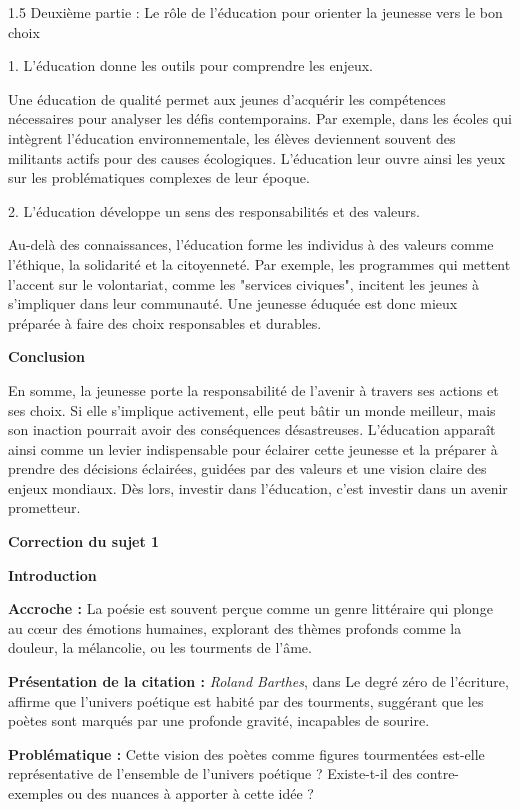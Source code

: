 \documentclass[12pt]{article}
\begin{document}
\begin{spacing}{1.5}
Deuxième partie : Le rôle de l'éducation pour orienter la jeunesse vers le bon choix

1. L'éducation donne les outils pour comprendre les enjeux.
  
Une éducation de qualité permet aux jeunes d'acquérir les compétences nécessaires pour analyser les défis contemporains. Par exemple, dans les écoles qui intègrent l'éducation environnementale, les élèves deviennent souvent des militants actifs pour des causes écologiques. L'éducation leur ouvre ainsi les yeux sur les problématiques complexes de leur époque.

2. L'éducation développe un sens des responsabilités et des valeurs.
  
Au-delà des connaissances, l'éducation forme les individus à des valeurs comme l'éthique, la solidarité et la citoyenneté. Par exemple, les programmes qui mettent l'accent sur le volontariat, comme les "services civiques", incitent les jeunes à s'impliquer dans leur communauté. Une jeunesse éduquée est donc mieux préparée à faire des choix responsables et durables.

\textbf{Conclusion}

En somme, la jeunesse porte la responsabilité de l'avenir à travers ses actions et ses choix. Si elle s'implique activement, elle peut bâtir un monde meilleur, mais son inaction pourrait avoir des conséquences désastreuses. L'éducation apparaît ainsi comme un levier indispensable pour éclairer cette jeunesse et la préparer à prendre des décisions éclairées, guidées par des valeurs et une vision claire des enjeux mondiaux. Dès lors, investir dans l'éducation, c'est investir dans un avenir prometteur.


\quad
\quad
\textbf{Correction du sujet 1}

\textbf{ Introduction}

\textbf{ Accroche :} La poésie est souvent perçue comme un genre littéraire qui plonge au cœur des émotions humaines, explorant des thèmes profonds comme la douleur, la mélancolie, ou les tourments de l'âme.

\textbf{ Présentation de la citation :} \emph{Roland Barthes}, dans Le degré zéro de l'écriture, affirme que l'univers poétique est habité par des tourments, suggérant que les poètes sont marqués par une profonde gravité, incapables de sourire.

\textbf{ Problématique :} Cette vision des poètes comme figures tourmentées est-elle représentative de l'ensemble de l'univers poétique ? Existe-t-il des contre-exemples ou des nuances à apporter à cette idée ?


\end{spacing}
\end{document}
